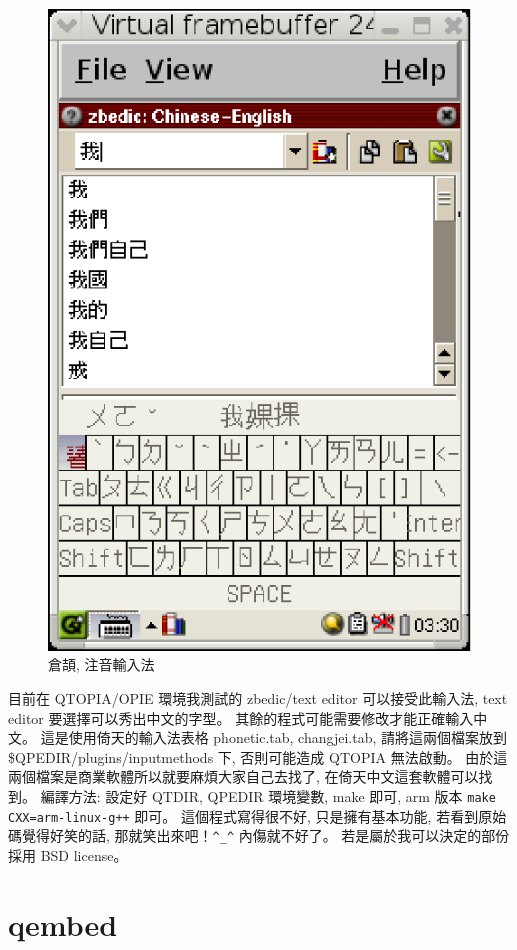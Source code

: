 \documentclass[12pt,a4paper]{article}
\begin{document}
\begin{CJK}{UTF8}{bsmi}
\begin{figure}[htbp]
\includegraphics[scale=0.9]{eps/phonetic.eps}
\caption{倉頡, 注音輸入法}
\end{figure}

 目前在 QTOPIA/OPIE 環境我測試的 zbedic/text editor 可以接受此輸入法,
 text editor 要選擇可以秀出中文的字型。
 其餘的程式可能需要修改才能正確輸入中文。
 這是使用倚天的輸入法表格 phonetic.tab, changjei.tab,
 請將這兩個檔案放到 \$QPEDIR/plugins/inputmethods 下,
 否則可能造成 QTOPIA 無法啟動。 	
 由於這兩個檔案是商業軟體所以就要麻煩大家自己去找了,
 在倚天中文這套軟體可以找到。
 編譯方法: 設定好 QTDIR, QPEDIR 環境變數,
 make 即可,
 arm 版本 \verb|make CXX=arm-linux-g++| 即可。
 這個程式寫得很不好, 只是擁有基本功能,
 若看到原始碼覺得好笑的話, 那就笑出來吧！\verb+^_^+
 內傷就不好了。
 若是屬於我可以決定的部份採用 BSD license。

\section{qembed}


\end{CJK}
\end{document}
